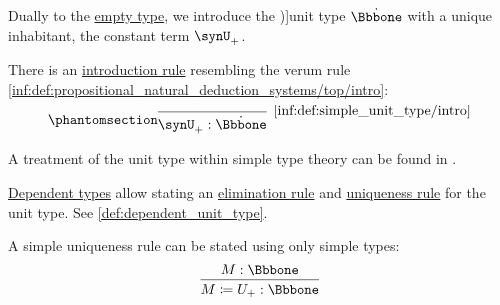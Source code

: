 \begin{definition}\label{def:simple_unit_type}\mimprovised
  Dually to the \hyperref[def:simple_empty_type]{empty type}, we introduce the \term[en=unit type (\cite[\S 4.3.4]{Mimram2020ProgramEqualsProof})]{unit type} \( \syn\Bbbone \) with a unique inhabitant, the constant term \( \synU_+ \).

  There is an \hyperref[rem:type_theory_rule_classification/intro]{introduction rule} resembling the verum rule \ref{inf:def:propositional_natural_deduction_systems/top/intro}:
  \begin{equation*}\taglabel[\ensuremath{ \Bbbone_+ }]{inf:def:simple_unit_type/intro}
    \begin{prooftree}
      \infer0[\ref{inf:def:simple_unit_type/intro}]{ \synU_+: \syn\Bbbone }
    \end{prooftree}
  \end{equation*}
\end{definition}
\begin{comments}
  \item A treatment of the unit type within simple type theory can be found in \cite[\S 4.3.2]{Mimram2020ProgramEqualsProof}.

  \item \hyperref[con:dependent_type]{Dependent types} allow stating an \hyperref[rem:type_theory_rule_classification/intro]{elimination rule} and \hyperref[rem:type_theory_rule_classification/equality/uniq]{uniqueness rule} for the unit type. See \cref{def:dependent_unit_type}.

  A simple uniqueness rule can be stated using only simple types:
  \begin{equation*}
    \begin{prooftree}
      \hypo{ M: \Bbbone }
      \infer1{ M \coloneqq U_+: \Bbbone }
    \end{prooftree}
  \end{equation*}
\end{comments}

